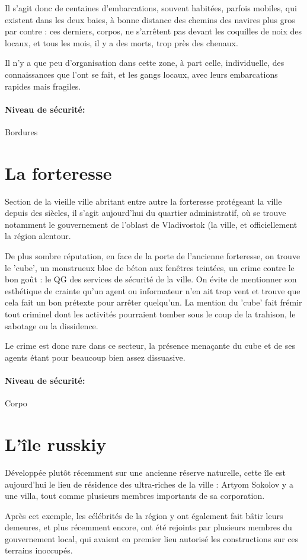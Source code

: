 \documentclass[10pt,a4paper]{book}
\begin{document}
Il s'agit donc de centaines d'embarcations, souvent habitées, parfois mobiles, qui existent dans les deux baies, à bonne distance des chemins des navires plus gros par contre : ces derniers, corpos, ne s'arrêtent pas devant les coquilles de noix des locaux, et tous les mois, il y a des morts, trop près des chenaux.

Il n'y a que peu d'organisation dans cette zone, à part celle, individuelle, des connaissances que l'ont se fait, et les gangs locaux, avec leurs embarcations rapides mais fragiles.
\paragraph{Niveau de sécurité:}Bordures
\section{La forteresse}
Section de la vieille ville abritant entre autre la forteresse protégeant la ville depuis des siècles, il s’agit aujourd'hui du quartier administratif, où se trouve notamment le gouvernement de l'oblast de Vladivostok (la ville, et officiellement la région alentour.

De plus sombre réputation, en face de la porte de l'ancienne forteresse, on trouve le 'cube', un monstrueux bloc de béton aux fenêtres teintées, un crime contre le bon goût : le QG des services de sécurité de la ville. On évite de mentionner son esthétique de crainte qu'un agent ou informateur n'en ait trop vent et trouve que cela fait un bon prétexte pour arrêter quelqu'un. La mention du 'cube' fait frémir tout criminel dont les activités pourraient tomber sous le coup de la trahison, le sabotage ou la dissidence.

Le crime est donc rare dans ce secteur, la présence menaçante du cube et de ses agents étant pour beaucoup bien assez dissuasive.
\paragraph{Niveau de sécurité:}Corpo
\section{L'île russkiy}
Développée plutôt récemment sur une ancienne réserve naturelle, cette île est aujourd'hui le lieu de résidence des ultra-riches de la ville : Artyom Sokolov y a une villa, tout comme plusieurs membres importants de sa corporation.

Après cet exemple, les célébrités de la région y ont également fait bâtir leurs demeures, et plus récemment encore, ont été rejoints par plusieurs membres du gouvernement local, qui avaient en premier lieu autorisé les constructions sur ces terrains inoccupés.
\end{document}
